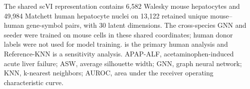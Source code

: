 The shared scVI representation contains 6,582 Walesky mouse hepatocytes and 49,984 Matchett human hepatocyte nuclei on 13,122 retained unique mouse--human gene-symbol pairs, with 30 latent dimensions. The cross-species GNN and seeder were trained on mouse cells in these shared coordinates; human donor labels were not used for model training. \SelfOnly{} is the primary human analysis and Reference-KNN is a sensitivity analysis. APAP-ALF, acetaminophen-induced acute liver failure; ASW, average silhouette width; GNN, graph neural network; KNN, k-nearest neighbors; AUROC, area under the receiver operating characteristic curve.